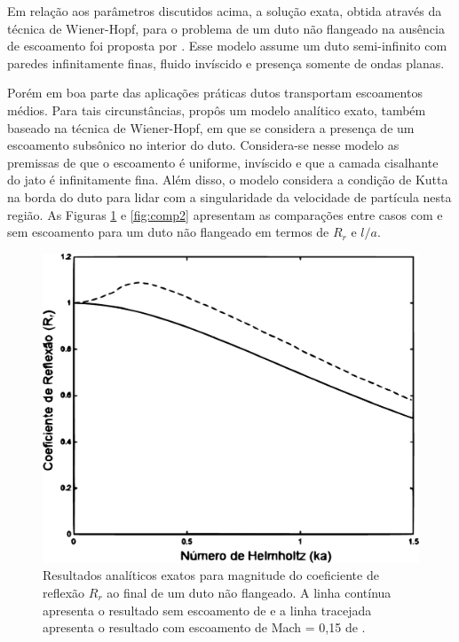 Em relação aos parâmetros discutidos acima, a solução exata, obtida através da técnica de Wiener-Hopf, para o problema de um duto não flangeado na ausência de escoamento foi proposta por . Esse modelo assume um duto semi-infinito com paredes infinitamente finas, fluido invíscido e presença somente de ondas planas. 

 Porém em boa parte das aplicações práticas dutos transportam escoamentos médios. Para tais circunstâncias,  propôs um modelo analítico exato, também baseado na técnica de Wiener-Hopf, em que se considera a presença de um escoamento subsônico no interior do duto. Considera-se nesse modelo as premissas de que o escoamento é uniforme, invíscido e que a camada cisalhante do jato é infinitamente fina. Além disso, o modelo considera a condição de Kutta na borda do duto para lidar com a singularidade da velocidade de partícula nesta região. As Figuras \ref{fig:comp1} e \ref{fig:comp2} apresentam as comparações entre casos com e sem escoamento para um duto não flangeado em termos de $R_{r}$ e $l/a$.

\begin{figure}[ht!]
\centering
  \includegraphics[width=.8\linewidth]{figuras/abs_r_comparacao.pdf}
  \caption[Magnitudes do coeficiente de reflexão $R_{r}$]{Resultados analíticos exatos para magnitude do coeficiente de reflexão $R_{r}$ ao final de um duto não flangeado. A linha contínua apresenta o resultado sem escoamento de  e a linha tracejada apresenta o resultado com escoamento de Mach = 0,15 de .}
  \label{fig:comp1}
\end{figure}

